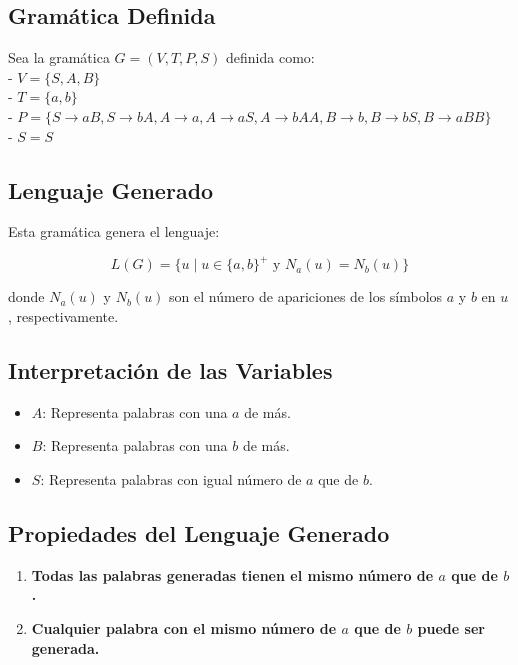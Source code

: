 \documentclass[12pt]{report} %
\providecommand{\tightlist}{%
  \setlength{\itemsep}{0pt}\setlength{\parskip}{0pt}}
\begin{document}
\hypertarget{gramuxe1tica-definida}{%
\subsection{Gramática Definida}\label{gramuxe1tica-definida}}

Sea la gramática \(G = (V, T, P, S)\) definida como:\\
- \(V = \{S, A, B\}\)\\
- \(T = \{a, b\}\)\\
-
\(P = \{S \to aB, S \to bA, A \to a, A \to aS, A \to bAA, B \to b, B \to bS, B \to aBB\}\)\\
- \(S = S\)

\hypertarget{lenguaje-generado}{%
\subsection{Lenguaje Generado}\label{lenguaje-generado}}

Esta gramática genera el lenguaje:

\[
L(G) = \{u \mid u \in \{a, b\}^+ \text{ y } N_a(u) = N_b(u)\}
\]

donde \(N_a(u)\) y \(N_b(u)\) son el número de apariciones de los
símbolos \(a\) y \(b\) en \(u\), respectivamente.

\hypertarget{interpretaciuxf3n-de-las-variables}{%
\subsection{Interpretación de las
Variables}\label{interpretaciuxf3n-de-las-variables}}

\begin{itemize}
\tightlist
\item
  \(A\): Representa palabras con una \(a\) de más.\\
\item
  \(B\): Representa palabras con una \(b\) de más.\\
\item
  \(S\): Representa palabras con igual número de \(a\) que de \(b\).
\end{itemize}

\hypertarget{propiedades-del-lenguaje-generado}{%
\subsection{Propiedades del Lenguaje
Generado}\label{propiedades-del-lenguaje-generado}}

\begin{enumerate}
\def\labelenumi{\arabic{enumi}.}
\tightlist
\item
  \textbf{Todas las palabras generadas tienen el mismo número de \(a\)
  que de \(b\).}\\
\item
  \textbf{Cualquier palabra con el mismo número de \(a\) que de \(b\)
  puede ser generada.}
\end{enumerate}
\end{document}
